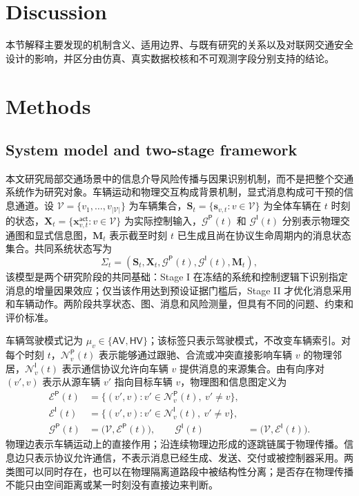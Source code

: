 \documentclass[10pt,a4paper,twocolumn]{article}
\newcommand{\revBlue}[1]{#1}
\begin{document}
\section*{Discussion}
本节解释主要发现的机制含义、适用边界、与既有研究的关系以及对联网交通安全设计的影响，并区分由仿真、真实数据校核和不可观测字段分别支持的结论。

\section*{Methods}
\subsection*{System model and two-stage framework}
\revBlue{本文研究局部交通场景中的信息介导风险传播与因果识别机制，而不是把整个交通系统作为研究对象。车辆运动和物理交互构成背景机制，显式消息构成可干预的信息通道。设 $\mathcal V=\{v_1,\ldots,v_{|\mathcal V|}\}$ 为车辆集合，$\bm S_t=\{\bm s_{v,t}:v\in\mathcal V\}$ 为全体车辆在 $t$ 时刻的状态，$\bm X_t=\{\bm x_{v,t}^{\mathsf{act}}:v\in\mathcal V\}$ 为实际控制输入，$\mathcal G^{\mathsf P}(t)$ 和 $\mathcal G^{\mathsf I}(t)$ 分别表示物理交通图和显式信息图，$\bm M_t$ 表示截至时刻 $t$ 已生成且尚在协议生命周期内的消息状态集合。共同系统状态写为}
\begin{equation}
\Sigma_t=\left(\bm S_t,\bm X_t,\mathcal G^{\mathsf P}(t),\mathcal G^{\mathsf I}(t),\bm M_t\right),
\end{equation}
\revBlue{该模型是两个研究阶段的共同基础：Stage I 在冻结的系统和控制逻辑下识别指定消息的增量因果效应；仅当该作用达到预设证据门槛后，Stage II 才优化消息采用和车辆动作。两阶段共享状态、图、消息和风险测量，但具有不同的问题、约束和评价标准。}

\revBlue{车辆驾驶模式记为 $\mu_v\in\{\mathsf{AV},\mathsf{HV}\}$；该标签只表示驾驶模式，不改变车辆索引。对每个时刻 $t$，$\mathcal{N}_v^{\mathsf P}(t)$ 表示能够通过跟驰、合流或冲突直接影响车辆 $v$ 的物理邻居，$\mathcal{N}_v^{\mathsf I}(t)$ 表示通信协议允许向车辆 $v$ 提供消息的来源集合。由有向序对 $(v',v)$ 表示从源车辆 $v'$ 指向目标车辆 $v$，物理图和信息图定义为}
\begin{equation}
\begin{aligned}
\mathcal{E}^{\mathsf P}(t)&=\{(v',v):v'\in\mathcal{N}_v^{\mathsf P}(t),\ v'\neq v\},\\
\mathcal{E}^{\mathsf I}(t)&=\{(v',v):v'\in\mathcal{N}_v^{\mathsf I}(t),\ v'\neq v\},\\
\mathcal{G}^{\mathsf P}(t)&=\bigl(\mathcal{V},\mathcal{E}^{\mathsf P}(t)\bigr),\qquad
\mathcal{G}^{\mathsf I}(t)&=\bigl(\mathcal{V},\mathcal{E}^{\mathsf I}(t)\bigr).
\end{aligned}
\end{equation}
物理边表示车辆运动上的直接作用；沿连续物理边形成的逐跳链属于物理传播。信息边只表示协议允许通信，不表示消息已经生成、发送、交付或被控制器采用。两类图可以同时存在，也可以在物理隔离道路段中被结构性分离；是否存在物理传播不能只由空间距离或某一时刻没有直接边来判断。
\end{document}
